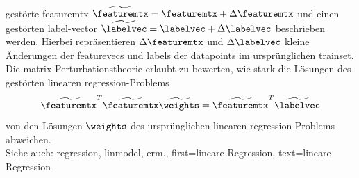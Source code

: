 {{{{{{		 gestörte \gls{featuremtx} $\widetilde{\featuremtx} = \featuremtx + \Delta \featuremtx$
		 und einen gestörten \gls{label}-\gls{vector} $\widetilde{\labelvec} = \labelvec + \Delta \labelvec$ 
		 beschrieben werden. Hierbei repräsentieren $\Delta \featuremtx$ und $\Delta \labelvec$ kleine Änderungen 
		 der \glspl{featurevec} und \glspl{label} der \glspl{datapoint} im ursprünglichen \gls{trainset}. 
		 Die \gls{matrix}-Perturbationstheorie erlaubt zu bewerten, 
		 wie stark die Lösungen des gestörten linearen \gls{regression}-Problems \cite[Sec.\ 2.6]{GolubVanLoanBook}
		 $$\widetilde{\featuremtx}^{T} \widetilde{\featuremtx} \widetilde{\weights} = 
		 \widetilde{\featuremtx}^{T} \widetilde{\labelvec}$$
		 von den Lösungen $\weights$ des ursprünglichen linearen \gls{regression}-Problems abweichen.
		 \\
		Siehe auch: \gls{regression}, \gls{linmodel}, \gls{erm}.},
	first={lineare Regression},
	text={lineare Regression}
}

}}}}
